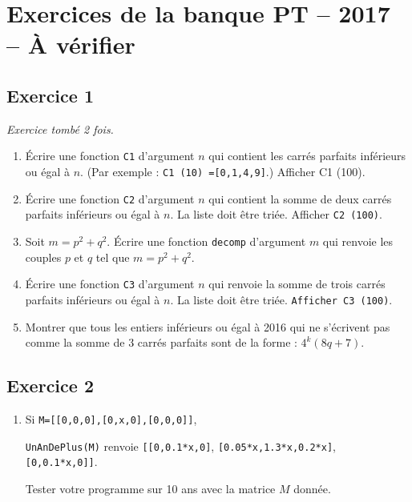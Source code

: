 \documentclass[10pt,fleqn]{article} %
\begin{document}
\newpage

\section{Exercices de la banque PT -- 2017 -- À vérifier}

\begin{multicols}{2}

\subsection*{Exercice 1}
\textit{Exercice tombé 2 fois.}
\begin{enumerate}
\item Écrire une fonction \texttt{C1} d'argument $n$ qui contient les carrés parfaits inférieurs ou égal à $n$. (Par exemple : \texttt{C1 (10) =[0,1,4,9]}.) Afficher C1 (100). 

\item Écrire une fonction \texttt{C2} d'argument $n$ qui contient la somme de deux carrés parfaits inférieurs ou égal à $n$. La liste doit être triée. Afficher \texttt{C2 (100)}.

\item Soit $m= p^2 + q^2$. Écrire une fonction \texttt{decomp} d'argument $m$ qui renvoie les couples $p$ et $q$ tel que $m= p^2 + q^2$. 

\item Écrire une fonction \texttt{C3} d'argument $n$ qui renvoie la somme de trois carrés parfaits inférieurs ou égal à $n$. La liste doit être triée. \texttt{Afficher C3 (100)}.

\item  Montrer que tous les entiers inférieurs ou égal à 2016 qui ne s'écrivent pas comme la somme de 3 carrés parfaits sont de la forme : $4^k  (8q+7)$. 
\end{enumerate}


\subsection*{Exercice 2}
\begin{enumerate}
\item Si \texttt{M=[[0,0,0],[0,x,0],[0,0,0]]}, 

\texttt{UnAnDePlus(M)} renvoie 
\texttt{[[0,0.1*x,0]}, \texttt{[0.05*x,1.3*x,0.2*x]}, \texttt{[0,0.1*x,0]]}. 

Tester votre programme sur 10 ans avec la matrice $M$ donnée.



\end{enumerate}
\end{multicols}
\end{document}
